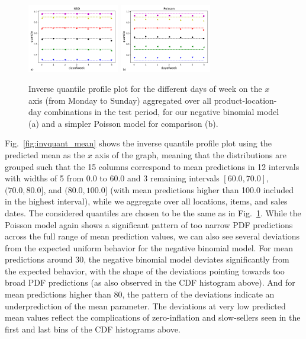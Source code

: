 \documentclass[BCOR=1mm, DIV=calc,10pt,
twoside=true,
twocolumn,
headings=normal]{scrartcl}
\newcommand{\fig}{Fig.~}
\begin{document}
\begin{figure}
\begin{center}
\includegraphics[width=4cm]{figs/invquant_dayofweek_nbinom}
\includegraphics[width=4cm]{figs/invquant_dayofweek_poisson}
\caption{\label{fig:invquant_dayofweek} Inverse quantile profile plot for the different days of week on the $x$ axis (from Monday to Sunday) aggregated over all product-location-day combinations in the test period, for our negative binomial model (a) and a simpler Poisson model for comparison (b).}
\end{center}
\end{figure}

\fig \ref{fig:invquant_mean} shows the inverse quantile profile plot using the predicted mean as the $x$ axis of the graph, meaning that the distributions are grouped such that the 15 columns correspond to mean predictions in 12 intervals with widths of 5 from 0.0 to 60.0 and 3 remaining intervals $[60.0, 70.0]$, $(70.0, 80.0]$, and $(80.0, 100.0]$ (with mean predictions higher than 100.0 included in the highest interval), while we aggregate over all locations, items, and sales dates. The considered quantiles are chosen to be the same as in \fig \ref{fig:invquant_dayofweek}. While the Poisson model again shows a significant pattern of too narrow PDF predictions across the full range of mean prediction values, we can also see several deviations from the expected uniform behavior for the negative binomial model. For mean predictions around $30$, the negative binomial model deviates significantly from the expected behavior, with the shape of the deviations pointing towards too broad PDF predictions (as also observed in the CDF histogram above). And for mean predictions higher than $80$, the pattern of the deviations indicate an underprediction of the mean parameter. The deviations at very low predicted mean values reflect the complications of zero-inflation and slow-sellers seen in the first and last bins of the CDF histograms above.
\end{document}
